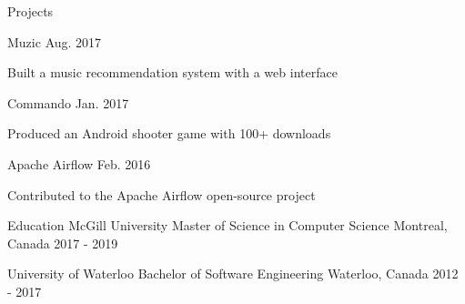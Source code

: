 \documentclass[12pt]{simple-resume}
\begin{document}
%
\begin{rSection}{Projects}%
\begin{entry}
      {Muzic}
      {}
      {Aug. 2017}
      {}%
    \begin{entryItems}
        \item {Built a music recommendation system with a web interface}
    \end{entryItems}
\end{entry}
%
\begin{entry}
      {Commando}
      {}
      {}
      {Jan. 2017}%
    \begin{entryItems}
        \item {Produced an Android shooter game with 100+ downloads}
    \end{entryItems}
\end{entry}
%
\begin{entry}
    {Apache Airflow}
    {} 
    {}
    {Feb. 2016}%
    \begin{entryItems}%
        \item {Contributed to the Apache Airflow open-source project}
    \end{entryItems}
\end{entry}
\end{rSection}
%
\begin{rSection}{Education}%
\education
    {McGill University}
    {Master of Science in Computer Science}
    {Montreal, Canada}
    {2017 - 2019}

\education
    {University of Waterloo}
    {Bachelor of Software Engineering}
    {Waterloo, Canada}
    {2012 - 2017}
\end{rSection}
\end{document}
